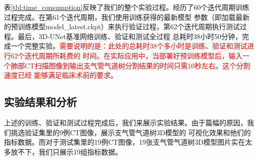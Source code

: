 表\ref{tbl:time_consumption}反映了我们的整个实验过程。经历了60个迭代周期训练过程完成。在第61个迭代周期，我们使用训练获得的最新模型
参数（即加载最新的预训练模型model\_latest.ckpt）来执行验证过程，第62个迭代周期执行测试过程。最后，3D-UNet基准网络训练、验证和测试全过程
总耗时38小时50分钟，完成一个完整实验。\textcolor{red}{需要说明的是：此处的总耗时38个多小时是训练、验证和测试进行62个迭代周期所耗费的
时间。在实际应用中，当部署好预训练模型后，输入一个肺部CT扫描图像到输出支气管气道树分割结果的时间只需10秒左右。这个分割速度已经
能够满足临床术前的要求。}

\subsection{实验结果和分析}\label{subsec:experiment_results}
上述的训练、验证和测试过程完成后，我们来展示实验结果。由于篇幅的原因，我们挑选验证集里的9例CT图像，展示支气管气道树3D模型的
可视化效果和他们的指标数据。而对于测试集里的19例CT图像，19张支气管气道树3D模型图片实在太多放不下，我们只展示19组指标数据。


